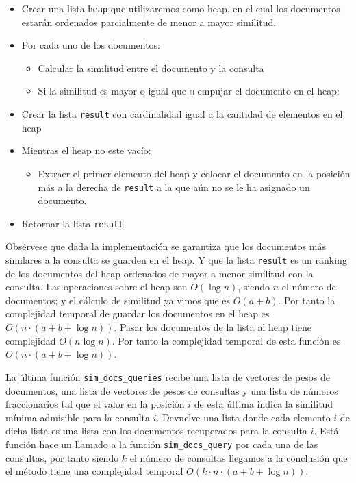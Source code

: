 \documentclass[runningheads]{llncs}
\begin{document}
	\begin{itemize}
		\item Crear una lista \verb|heap| que utilizaremos como heap, en el cual los documentos estar\'an ordenados parcialmente de menor a mayor similitud.
		\item Por cada uno de los documentos:
		\begin{itemize}
			\item Calcular la similitud entre el documento y la consulta
			\item Si la similitud es mayor o igual que \verb|m| empujar el documento en el heap:
		\end{itemize}
		\item Crear la lista \verb|result| con cardinalidad igual a la cantidad de elementos en el heap
		\item Mientras el heap no este vac\'io:
		\begin{itemize}
			\item Extraer el primer elemento del heap y colocar el documento en la posici\'on m\'as a la derecha de \verb|result| a la que a\'un no se le ha asignado un documento.
		\end{itemize}
		\item Retornar la lista \verb|result|
	\end{itemize}
	
	Obs\'ervese que dada la implementaci\'on se garantiza que los documentos m\'as similares a la consulta se guarden en el heap. Y que la lista \verb|result| es un ranking de los documentos del heap ordenados de mayor a menor similitud con la consulta. Las operaciones sobre el heap son $O(\log n)$, siendo $n$ el n\'umero de documentos; y el c\'alculo de similitud ya vimos que es $O(a + b)$. Por tanto la complejidad temporal de guardar los documentos en el heap es $O(n\cdot(a+b+\log n))$. Pasar los documentos de la lista al heap tiene complejidad $O(n\log n)$.  Por tanto la complejidad temporal de esta funci\'on es $O(n\cdot(a+b+\log n))$.
	
	La \'ultima funci\'on \verb|sim_docs_queries| recibe una lista de vectores de pesos de documentos, una lista de vectores de pesos de consultas y una lista de n\'umeros fraccionarios tal que el valor en la posici\'on $i$ de esta \'ultima indica la similitud m\'inima admisible para la consulta $i$. Devuelve una lista donde cada elemento $i$ de dicha lista es una lista con los documentos recuperados para la consulta $i$. Est\'a funci\'on hace un llamado a la funci\'on \verb|sim_docs_query| por cada una de las consultas, por tanto siendo $k$ el n\'umero de consultas llegamos a la conclusi\'on que el m\'etodo tiene una complejidad temporal $O(k\cdot n\cdot(a+b+\log n))$.
	
\end{document}
